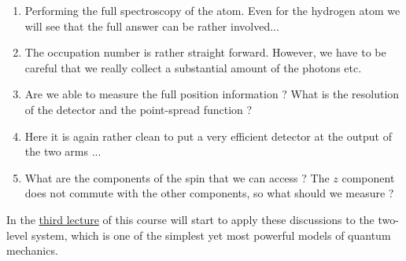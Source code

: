 \documentclass[10pt]{article}
\begin{document}
\begin{enumerate}
\item Performing the full spectroscopy of the atom. Even for the hydrogen atom we will see that the full answer can be rather involved...
\item The occupation number is rather straight forward. However, we have to be careful that we really collect a substantial amount of the photons etc.
\item Are we able to measure the full position information ? What is the resolution of the detector and the point-spread function ?
\item Here it is again rather clean to put a very efficient detector at the output of the two arms ...
\item What are the components of the spin that we can access ? The $z$ component does not commute with the other components, so what should we measure ?
\end{enumerate}

In the \href{https://www.authorea.com/326444/GsbfEypTdf4dvncV23L8_Q}{third lecture} of this course will start to apply these discussions to the two-level system, which is one of the simplest yet most powerful models of quantum mechanics.

\FloatBarrier


\end{document}
